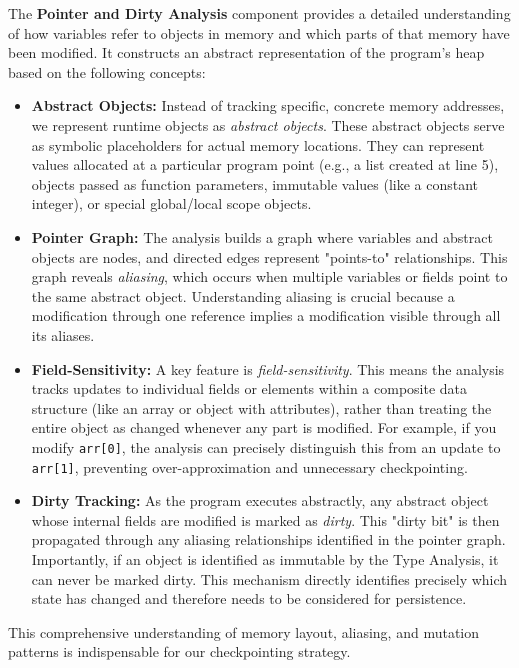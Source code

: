 The \textbf{Pointer and Dirty Analysis} component provides a detailed understanding of how variables refer to objects in memory and which parts of that memory have been modified. It constructs an abstract representation of the program's heap based on the following concepts:

\begin{itemize}
    \item \textbf{Abstract Objects:} Instead of tracking specific, concrete memory addresses, we represent runtime objects as \emph{abstract objects}. These abstract objects serve as symbolic placeholders for actual memory locations. They can represent values allocated at a particular program point (e.g., a list created at line 5), objects passed as function parameters, immutable values (like a constant integer), or special global/local scope objects.
    \item \textbf{Pointer Graph:} The analysis builds a graph where variables and abstract objects are nodes, and directed edges represent "points-to" relationships. This graph reveals \emph{aliasing}, which occurs when multiple variables or fields point to the same abstract object. Understanding aliasing is crucial because a modification through one reference implies a modification visible through all its aliases.
    \item \textbf{Field-Sensitivity:} A key feature is \emph{field-sensitivity}. This means the analysis tracks updates to individual fields or elements within a composite data structure (like an array or object with attributes), rather than treating the entire object as changed whenever any part is modified. For example, if you modify \texttt{arr[0]}, the analysis can precisely distinguish this from an update to \texttt{arr[1]}, preventing over-approximation and unnecessary checkpointing.
    \item \textbf{Dirty Tracking:} As the program executes abstractly, any abstract object whose internal fields are modified is marked as \emph{dirty}. This "dirty bit" is then propagated through any aliasing relationships identified in the pointer graph. Importantly, if an object is identified as immutable by the Type Analysis, it can never be marked dirty. This mechanism directly identifies precisely which state has changed and therefore needs to be considered for persistence.
\end{itemize}
This comprehensive understanding of memory layout, aliasing, and mutation patterns is indispensable for our checkpointing strategy.

